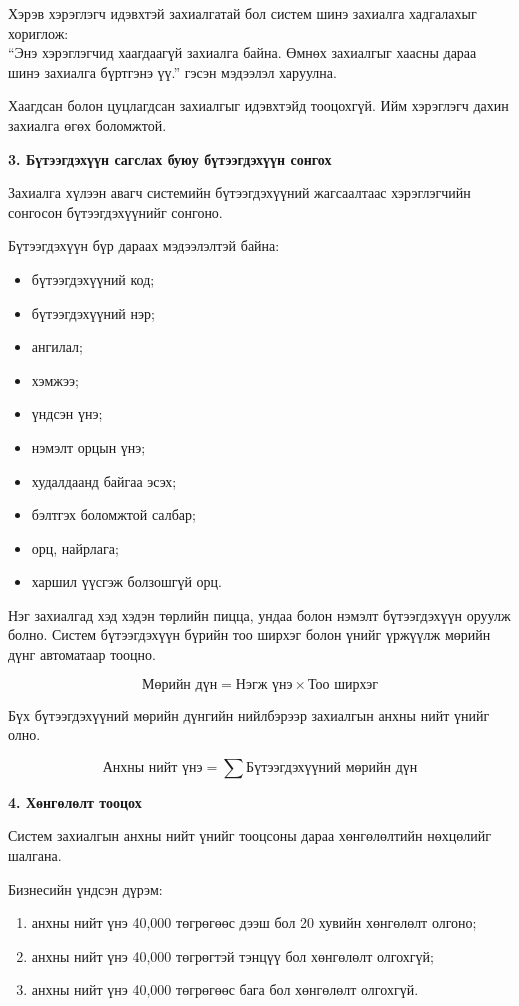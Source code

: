 Хэрэв хэрэглэгч идэвхтэй захиалгатай бол систем шинэ захиалга хадгалахыг хориглож: \\
“Энэ хэрэглэгчид хаагдаагүй захиалга байна. Өмнөх захиалгыг хаасны дараа шинэ захиалга бүртгэнэ үү.” гэсэн мэдээлэл харуулна.

Хаагдсан болон цуцлагдсан захиалгыг идэвхтэйд тооцохгүй. Ийм хэрэглэгч дахин захиалга өгөх боломжтой.

\textbf{3. Бүтээгдэхүүн сагслах буюу бүтээгдэхүүн сонгох}

Захиалга хүлээн авагч системийн бүтээгдэхүүний жагсаалтаас хэрэглэгчийн сонгосон бүтээгдэхүүнийг сонгоно.

Бүтээгдэхүүн бүр дараах мэдээлэлтэй байна:

\begin{itemize}
    \item бүтээгдэхүүний код;
    \item бүтээгдэхүүний нэр;
    \item ангилал;
    \item хэмжээ;
    \item үндсэн үнэ;
    \item нэмэлт орцын үнэ;
    \item худалдаанд байгаа эсэх;
    \item бэлтгэх боломжтой салбар;
    \item орц, найрлага;
    \item харшил үүсгэж болзошгүй орц.
\end{itemize}

Нэг захиалгад хэд хэдэн төрлийн пицца, ундаа болон нэмэлт бүтээгдэхүүн оруулж болно. Систем бүтээгдэхүүн бүрийн тоо ширхэг болон үнийг үржүүлж мөрийн дүнг автоматаар тооцно.

$$ \text{Мөрийн дүн}=\text{Нэгж үнэ}\times\text{Тоо ширхэг} $$

Бүх бүтээгдэхүүний мөрийн дүнгийн нийлбэрээр захиалгын анхны нийт үнийг олно.

$$ \text{Анхны нийт үнэ}=\sum \text{Бүтээгдэхүүний мөрийн дүн} $$

\textbf{4. Хөнгөлөлт тооцох}

Систем захиалгын анхны нийт үнийг тооцсоны дараа хөнгөлөлтийн нөхцөлийг шалгана.

Бизнесийн үндсэн дүрэм:

\begin{enumerate}
    \item анхны нийт үнэ 40,000 төгрөгөөс дээш бол 20 хувийн хөнгөлөлт олгоно;
    \item анхны нийт үнэ 40,000 төгрөгтэй тэнцүү бол хөнгөлөлт олгохгүй;
    \item анхны нийт үнэ 40,000 төгрөгөөс бага бол хөнгөлөлт олгохгүй.
\end{enumerate}


